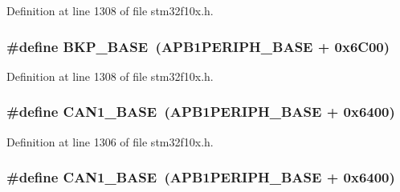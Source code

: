 Definition at line 1308 of file stm32f10x.\+h.

\subsubsection[{\texorpdfstring{B\+K\+P\+\_\+\+B\+A\+SE}{BKP_BASE}}]{\setlength{\rightskip}{0pt plus 5cm}\#define B\+K\+P\+\_\+\+B\+A\+SE~({\bf A\+P\+B1\+P\+E\+R\+I\+P\+H\+\_\+\+B\+A\+SE} + 0x6\+C00)}\hypertarget{group___peripheral__memory__map_gaa15d5a9f40794105397ba5ea567c4ae1}{}\label{group___peripheral__memory__map_gaa15d5a9f40794105397ba5ea567c4ae1}


Definition at line 1308 of file stm32f10x.\+h.

\subsubsection[{\texorpdfstring{C\+A\+N1\+\_\+\+B\+A\+SE}{CAN1_BASE}}]{\setlength{\rightskip}{0pt plus 5cm}\#define C\+A\+N1\+\_\+\+B\+A\+SE~({\bf A\+P\+B1\+P\+E\+R\+I\+P\+H\+\_\+\+B\+A\+SE} + 0x6400)}\hypertarget{group___peripheral__memory__map_gad8e45ea6c032d9fce1b0516fff9d8eaa}{}\label{group___peripheral__memory__map_gad8e45ea6c032d9fce1b0516fff9d8eaa}


Definition at line 1306 of file stm32f10x.\+h.

\subsubsection[{\texorpdfstring{C\+A\+N1\+\_\+\+B\+A\+SE}{CAN1_BASE}}]{\setlength{\rightskip}{0pt plus 5cm}\#define C\+A\+N1\+\_\+\+B\+A\+SE~({\bf A\+P\+B1\+P\+E\+R\+I\+P\+H\+\_\+\+B\+A\+SE} + 0x6400)}\hypertarget{group___peripheral__memory__map_gad8e45ea6c032d9fce1b0516fff9d8eaa}{}\label{group___peripheral__memory__map_gad8e45ea6c032d9fce1b0516fff9d8eaa}


